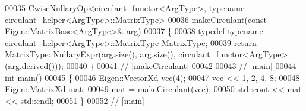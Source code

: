 \begin{DoxyCode}
00035 \hyperlink{group___core___module_class_eigen_1_1_cwise_nullary_op}{CwiseNullaryOp<circulant\_functor<ArgType>}, \textcolor{keyword}{typename} 
      \hyperlink{group___core___module_class_eigen_1_1_matrix}{circulant\_helper<ArgType>::MatrixType}>
00036 makeCirculant(\textcolor{keyword}{const} \hyperlink{group___core___module_class_eigen_1_1_matrix_base}{Eigen::MatrixBase<ArgType>}& arg)
00037 \{
00038   \textcolor{keyword}{typedef} \textcolor{keyword}{typename} \hyperlink{group___core___module_class_eigen_1_1_matrix}{circulant\_helper<ArgType>::MatrixType} MatrixType;
00039   \textcolor{keywordflow}{return} MatrixType::NullaryExpr(arg.size(), arg.size(), 
      \hyperlink{classcirculant__functor}{circulant\_functor<ArgType>}(arg.derived()));
00040 \}
00041 \textcolor{comment}{// [makeCirculant]}
00042 
00043 \textcolor{comment}{// [main]}
00044 \textcolor{keywordtype}{int} main()
00045 \{
00046   Eigen::VectorXd vec(4);
00047   vec << 1, 2, 4, 8;
00048   Eigen::MatrixXd mat;
00049   mat = makeCirculant(vec);
00050   std::cout << mat << std::endl;
00051 \}
00052 \textcolor{comment}{// [main]}
\end{DoxyCode}
